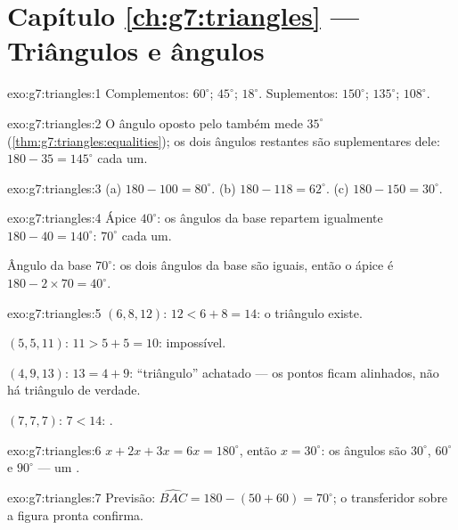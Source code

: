 \section*{Capítulo \ref{ch:g7:triangles} --- Triângulos e ângulos}

\begin{solution}{exo:g7:triangles:1}
Complementos: $60^\circ$; $45^\circ$; $18^\circ$.
Suplementos: $150^\circ$; $135^\circ$; $108^\circ$.
\end{solution}

\begin{solution}{exo:g7:triangles:2}
O ângulo oposto pelo  também mede $35^\circ$
(\cref{thm:g7:triangles:equalities}); os dois ângulos restantes são
suplementares dele: $180 - 35 = 145^\circ$ cada um.
\end{solution}

\begin{solution}{exo:g7:triangles:3}
(a) $180 - 100 = 80^\circ$. \quad
(b) $180 - 118 = 62^\circ$. \quad
(c) $180 - 150 = 30^\circ$.
\end{solution}

\begin{solution}{exo:g7:triangles:4}
Ápice $40^\circ$: os ângulos da base repartem igualmente
$180 - 40 = 140^\circ$: $70^\circ$ cada um.

Ângulo da base $70^\circ$: os dois ângulos da base são iguais, então o
ápice é $180 - 2 \times 70 = 40^\circ$.
\end{solution}

\begin{solution}{exo:g7:triangles:5}
$(6, 8, 12)$: $12 < 6 + 8 = 14$: o triângulo existe.

$(5, 5, 11)$: $11 > 5 + 5 = 10$: impossível.

$(4, 9, 13)$: $13 = 4 + 9$: ``triângulo'' achatado --- os pontos ficam
alinhados, não há triângulo de verdade.

$(7, 7, 7)$: $7 < 14$: .
\end{solution}

\begin{solution}{exo:g7:triangles:6}
$x + 2x + 3x = 6x = 180^\circ$, então $x = 30^\circ$: os ângulos são
$30^\circ$, $60^\circ$ e $90^\circ$ --- um .
\end{solution}

\begin{solution}{exo:g7:triangles:7}
Previsão: $\widehat{BAC} = 180 - (50 + 60) = 70^\circ$; o transferidor
sobre a figura pronta confirma.
\end{solution}

